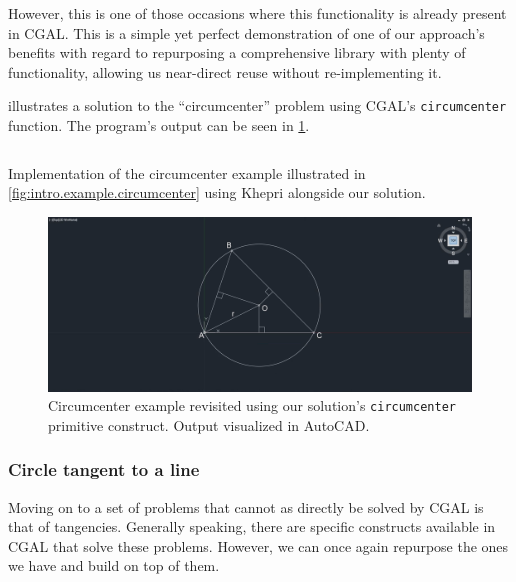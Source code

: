 However, this is one of those occasions where this functionality is already
present in \ac{CGAL}.  This is a simple yet perfect demonstration of one of our
approach's benefits with regard to repurposing a comprehensive library with
plenty of functionality, allowing us near-direct reuse without re-implementing
it.

 illustrates a solution to the
``circumcenter'' problem using \ac{CGAL}'s \texttt{circumcenter} function.  The
program's output can be seen in \cref{fig:solution.impl.gcps.circumcenter}.

\begin{listing}[htbp]
  \inputminted[highlightlines={2,5-7,19}]{julia}{jl/ex_circumcenter.jl}
  \caption[Circumcenter example using our solution]{
    Implementation of the circumcenter example illustrated in
    \cref{fig:intro.example.circumcenter} using Khepri alongside our solution.}%
  \label{lst:solution.impl.gcps.circumcenter}
\end{listing}

\begin{figure}[htbp]
  \includegraphics[width=\linewidth]{fig/autocad-circumcenter} 
  \caption[Circumcenter example using our solution]{
    Circumcenter example revisited using our solution's \texttt{circumcenter}
    primitive construct.  Output visualized in AutoCAD.}%
    \label{fig:solution.impl.gcps.circumcenter}
\end{figure}

\subsubsection{Circle tangent to a line}%
\label{sec:solution.impl.gcps.tangcirc2line}

Moving on to a set of problems that cannot as directly be solved by \ac{CGAL} is
that of tangencies.  Generally speaking, there are specific constructs available
in \ac{CGAL} that solve these problems.  However, we can once again repurpose
the ones we have and build on top of them.

